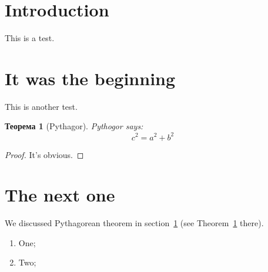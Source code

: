\documentclass[notitlepage]{article}
\newtheorem{theorem}{Теорема}
\begin{document}
    \section*{Introduction}
    This is a test.

    \section{It was the beginning}\label{sec:beg}
        This is another test.

        \begin{theorem}[Pythagor]\label{thm:Pyth}
            Pythogor says:
            \[
                c^2 = a^2 + b^2
            \]
        \end{theorem}
        \begin{proof}
            It's obvious.
        \end{proof}
    \section{The next one}
        We discussed Pythagorean theorem in section~\ref{sec:beg} (see
        Theorem~\ref{thm:Pyth} there).
        \begin{enumerate}
            \item One;
            \item Two;
        \end{enumerate}
\end{document}
